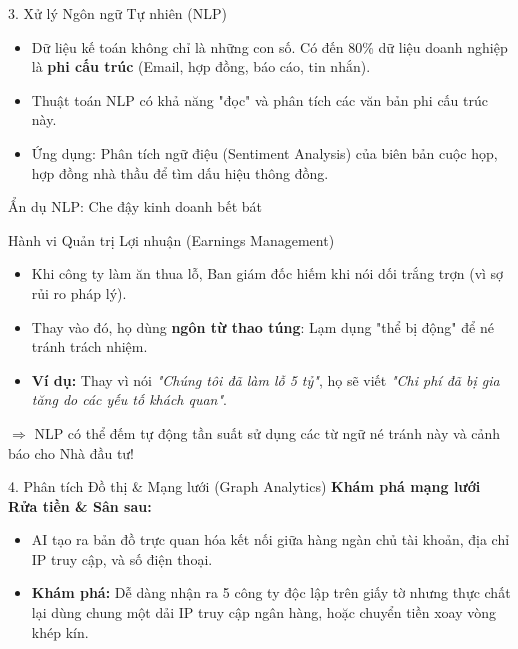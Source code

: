 \documentclass[aspectratio=169]{beamer}
\begin{document}
\begin{frame}{3. Xử lý Ngôn ngữ Tự nhiên (NLP)}
    \begin{itemize}
        \item Dữ liệu kế toán không chỉ là những con số. Có đến 80\% dữ liệu doanh nghiệp là \textbf{phi cấu trúc} (Email, hợp đồng, báo cáo, tin nhắn).
        \item Thuật toán NLP có khả năng "đọc" và phân tích các văn bản phi cấu trúc này.
        \item Ứng dụng: Phân tích ngữ điệu (Sentiment Analysis) của biên bản cuộc họp, hợp đồng nhà thầu để tìm dấu hiệu thông đồng.
    \end{itemize}
\end{frame}

\begin{frame}{Ẩn dụ NLP: Che đậy kinh doanh bết bát}
    \begin{exampleblock}{Hành vi Quản trị Lợi nhuận (Earnings Management)}
        \begin{itemize}
            \item Khi công ty làm ăn thua lỗ, Ban giám đốc hiếm khi nói dối trắng trợn (vì sợ rủi ro pháp lý).
            \item Thay vào đó, họ dùng \textbf{ngôn từ thao túng}: Lạm dụng "thể bị động" để né tránh trách nhiệm.
            \item \textbf{Ví dụ:} Thay vì nói \textit{"Chúng tôi đã làm lỗ 5 tỷ"}, họ sẽ viết \textit{"Chi phí đã bị gia tăng do các yếu tố khách quan"}.
        \end{itemize}
    \end{exampleblock}
    $\Rightarrow$ NLP có thể đếm tự động tần suất sử dụng các từ ngữ né tránh này và cảnh báo cho Nhà đầu tư!
\end{frame}

\begin{frame}{4. Phân tích Đồ thị \& Mạng lưới (Graph Analytics)}
    \textbf{Khám phá mạng lưới Rửa tiền \& Sân sau:}
    \begin{itemize}
        \item AI tạo ra bản đồ trực quan hóa kết nối giữa hàng ngàn chủ tài khoản, địa chỉ IP truy cập, và số điện thoại.
        \item \textbf{Khám phá:} Dễ dàng nhận ra 5 công ty độc lập trên giấy tờ nhưng thực chất lại dùng chung một dải IP truy cập ngân hàng, hoặc chuyển tiền xoay vòng khép kín.
    \end{itemize}
\end{frame}
\end{document}

